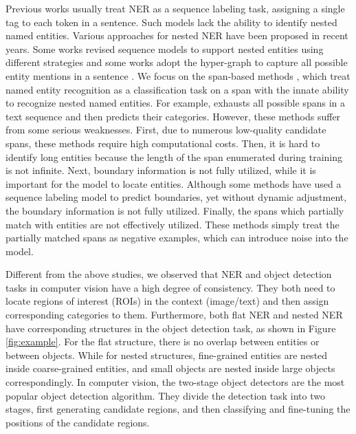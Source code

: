 \documentclass[11pt,a4paper]{article}
\begin{document}
Previous works usually treat NER as a sequence labeling task, assigning a single tag to each token in a sentence. Such models lack the ability to identify nested named entities. Various approaches for nested NER have been proposed in recent years. Some works revised sequence models to support nested entities using different strategies \citep{alex-etal-2007-recognising, ju-etal-2018-neural, strakova-etal-2019-neural, wang-etal-2020-pyramid} and some works adopt the hyper-graph to capture all possible entity mentions in a sentence \citep{lu-roth-2015-joint, katiyar-cardie-2018-nested}. We focus on the span-based methods \citep{sohrab-miwa-2018-deep, zheng-etal-2019-boundary, Tan_Qiu_Chen_Wang_Huang_2020}, which treat named entity recognition as a classification task on a span with the innate ability to recognize nested named entities. For example, \citet{sohrab-miwa-2018-deep} exhausts all possible spans in a text sequence and then predicts their categories. However, these methods suffer from some serious weaknesses. First, due to numerous low-quality candidate spans, these methods require high computational costs. Then, it is hard to identify long entities because the length of the span enumerated during training is not infinite. Next, boundary information is not fully utilized, while it is important for the model to locate entities. Although some methods \citep{zheng-etal-2019-boundary, Tan_Qiu_Chen_Wang_Huang_2020} have used a sequence labeling model to predict boundaries, yet without dynamic adjustment, the boundary information is not fully utilized. Finally, the spans which partially match with entities are not effectively utilized. These methods simply treat the partially matched spans as negative examples, which can introduce noise into the model.

Different from the above studies, we observed that NER and object detection tasks in computer vision have a high degree of consistency. They both need to locate regions of interest (ROIs) in the context (image/text) and then assign corresponding categories to them. Furthermore, both flat NER and nested NER have corresponding structures in the object detection task, as shown in Figure \ref{fig:example}. 
For the flat structure, there is no overlap between entities or between objects. While for nested structures, fine-grained entities are nested inside coarse-grained entities, and small objects are nested inside large objects correspondingly. 
In computer vision, the two-stage object detectors \citep{10.1109/CVPR.2014.81,10.1109/ICCV.2015.169,10.1109/TPAMI.2016.2577031,10.5555/3157096.3157139,8237584,8578742} are the most popular object detection algorithm. They divide the detection task into two stages, first generating candidate regions, and then classifying and fine-tuning the positions of the candidate regions.
\end{document}
